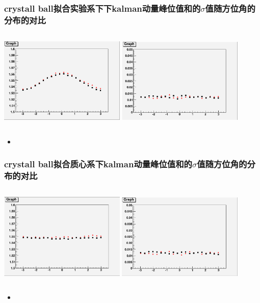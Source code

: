 \documentclass{beamer}
\begin{document}
\begin{frame}
    \frametitle{crystall ball拟合实验系下下kalman动量峰位值和的$\sigma$值随方位角的分布的对比}
    \begin{columns}
        \column{6.0cm}
        \includegraphics[width=6cm, keepaspectratio]{data/pmean_phi.png}
        \column{6.0cm}
        \includegraphics[width=6cm, keepaspectratio]{data/psigm_phi.png}
    \end{columns}
    \begin{itemize}
        \item 
    \end{itemize}

\end{frame}


\begin{frame}
    \frametitle{crystall ball拟合质心系下kalman动量峰位值和的$\sigma$值随方位角的分布的对比}
    \begin{columns}
        \column{6.0cm}
        \includegraphics[width=6cm, keepaspectratio]{data/pcmsmean_phi.png}
        \column{6.0cm}
        \includegraphics[width=6cm, keepaspectratio]{data/pcmssigm_phi.png}
    \end{columns}
    \begin{itemize}
        \item 
    \end{itemize}

\end{frame}
\end{document}
